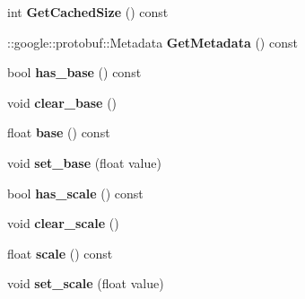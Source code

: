 \begin{DoxyCompactItemize}
\item 
\mbox{\label{classcaffe_1_1_log_parameter_a5e518a6d2f64168bbbfeb4f263216f41}} 
int {\bfseries Get\+Cached\+Size} () const
\item 
\mbox{\label{classcaffe_1_1_log_parameter_ae8589adb837d1275e452c3004a62fe65}} 
\+::google\+::protobuf\+::\+Metadata {\bfseries Get\+Metadata} () const
\item 
\mbox{\label{classcaffe_1_1_log_parameter_a0cfcf2c5dd6be15d94c943027a953ea4}} 
bool {\bfseries has\+\_\+base} () const
\item 
\mbox{\label{classcaffe_1_1_log_parameter_a4cf9d70130b38bb19f67d87404a182d6}} 
void {\bfseries clear\+\_\+base} ()
\item 
\mbox{\label{classcaffe_1_1_log_parameter_a2575b7118ba5db174463e67c38f87804}} 
float {\bfseries base} () const
\item 
\mbox{\label{classcaffe_1_1_log_parameter_af6bbef52b478012eea78cf4b08bad7e2}} 
void {\bfseries set\+\_\+base} (float value)
\item 
\mbox{\label{classcaffe_1_1_log_parameter_a4e772552a8e48fa740b593e7f9fd080b}} 
bool {\bfseries has\+\_\+scale} () const
\item 
\mbox{\label{classcaffe_1_1_log_parameter_a153d39814b8e9ddd5f3e34d08d660432}} 
void {\bfseries clear\+\_\+scale} ()
\item 
\mbox{\label{classcaffe_1_1_log_parameter_af9891363294aa8330aa691331c31c615}} 
float {\bfseries scale} () const
\item 
\mbox{\label{classcaffe_1_1_log_parameter_a851f017c1baaa396e2bdb1f4c17f3ef0}} 
void {\bfseries set\+\_\+scale} (float value)
\item 
\mbox{\label{classcaffe_1_1_log_parameter_a4b7f522520d71821ed48ce5e9f449e2f}} 

\end{DoxyCompactItemize}
